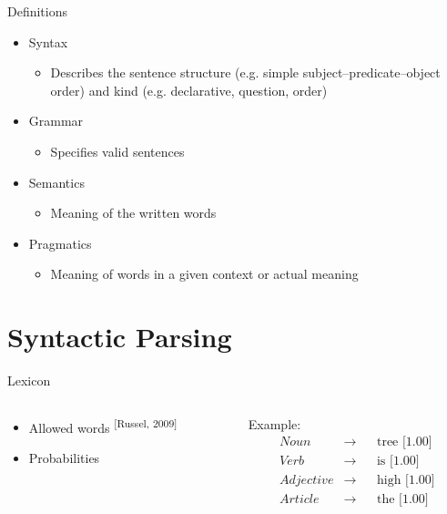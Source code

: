 \documentclass[14pt]{beamer}
\theoremstyle{remark}
\begin{document}
\begin{frame}[t]{Definitions}
	\begin{itemize}
		\item Syntax
		\begin{itemize}
			\item Describes the sentence structure (e.g. simple subject--predicate--object order) and kind (e.g. declarative, question, order)
		\end{itemize}
		\item Grammar
		\begin{itemize}
			\item Specifies valid sentences
		\end{itemize}
		\item Semantics
		\begin{itemize}
			\item Meaning of the written words
		\end{itemize}
		\item Pragmatics
		\begin{itemize}
			\item Meaning of words in a given context or actual meaning
		\end{itemize}
	\end{itemize}
\end{frame}

\section{Syntactic Parsing}

\begin{frame}[t,fragile]{Lexicon}
	\begin{columns}[t]
		\begin{column}{0.5\textwidth}
			\begin{itemize}
				\item Allowed words \textsuperscript{[Russel, 2009]}
				\item Probabilities
			\end{itemize}
		\end{column}
		\begin{column}{0.5\textwidth}
			Example:
			\begin{alignat*}{2}
				Noun &\rightarrow && \text{tree [1.00]} \\
				Verb &\rightarrow && \text{is [1.00]} \\
				Adjective &\rightarrow && \text{high [1.00]} \\
				Article &\rightarrow && \text{the [1.00]} \\
			\end{alignat*}
		\end{column}
	\end{columns}
\end{frame}
\end{document}
